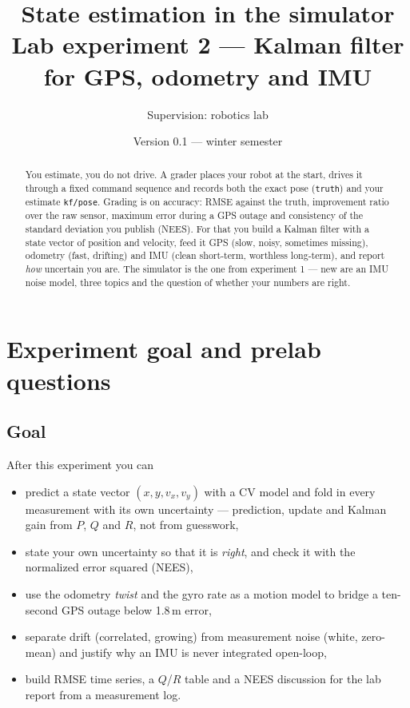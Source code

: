 \documentclass[12pt,a4paper]{scrartcl}
\title{\textbf{State estimation in the simulator}\\[2pt]
  \large Lab experiment 2 — Kalman filter for GPS, odometry and IMU}
\author{Supervision: robotics lab}
\date{Version 0.1 — winter semester}
\newcommand{\thema}[1]{\texttt{#1}}
\begin{document}
\maketitle

\begin{abstract}
\noindent
You estimate, you do not drive. A grader places your robot at the start, drives it
through a fixed command sequence and records both the exact pose
(\thema{truth}) and your estimate \thema{kf/pose}. Grading is on accuracy:
RMSE against the truth, improvement ratio over the raw sensor, maximum error
during a GPS outage and consistency of the standard deviation you publish
(NEES). For that you build a Kalman filter with a state vector of position and
velocity, feed it GPS (slow, noisy, sometimes missing), odometry
(fast, drifting) and IMU (clean short-term, worthless long-term), and report
\emph{how} uncertain you are. The simulator is the one from experiment 1 — new are
an IMU noise model, three topics and the question of whether your numbers are right.
\end{abstract}

\tableofcontents

\section{Experiment goal and prelab questions}\label{sec:vorfragen}
\subsection{Goal}
After this experiment you can
\begin{itemize}
  \item predict a state vector \((x,y,v_x,v_y)\) with a CV model and fold in every
        measurement with its own uncertainty — prediction, update and
        Kalman gain from \(P\), \(Q\) and \(R\), not from guesswork,
  \item state your own uncertainty so that it is \emph{right}, and check it with the
        normalized error squared (NEES),
  \item use the odometry \emph{twist} and the gyro rate as a motion model to bridge a
        ten-second GPS outage below 1.8\,m error,
  \item separate drift (correlated, growing) from measurement noise (white, zero-mean)
        and justify why an IMU is never integrated open-loop,
  \item build RMSE time series, a \(Q\)/\(R\) table and a
        NEES discussion for the lab report from a measurement log.
\end{itemize}
\end{document}
